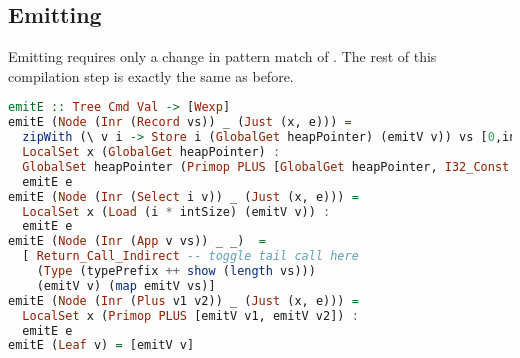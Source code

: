 \subsection{\label{subsection:emit2}Emitting}
Emitting requires only a change in pattern match of . The rest of this compilation step is exactly the same as before.

\begin{lstlisting}[language=Haskell]
emitE :: Tree Cmd Val -> [Wexp]
emitE (Node (Inr (Record vs)) _ (Just (x, e))) =
  zipWith (\ v i -> Store i (GlobalGet heapPointer) (emitV v)) vs [0,intSize..] ++
  LocalSet x (GlobalGet heapPointer) :
  GlobalSet heapPointer (Primop PLUS [GlobalGet heapPointer, I32_Const (length vs * intSize)]) :
  emitE e
emitE (Node (Inr (Select i v)) _ (Just (x, e))) =
  LocalSet x (Load (i * intSize) (emitV v)) :
  emitE e
emitE (Node (Inr (App v vs)) _ _)  =
  [ Return_Call_Indirect -- toggle tail call here
    (Type (typePrefix ++ show (length vs)))
    (emitV v) (map emitV vs)]
emitE (Node (Inr (Plus v1 v2)) _ (Just (x, e))) =
  LocalSet x (Primop PLUS [emitV v1, emitV v2]) :
  emitE e
emitE (Leaf v) = [emitV v]
\end{lstlisting}
